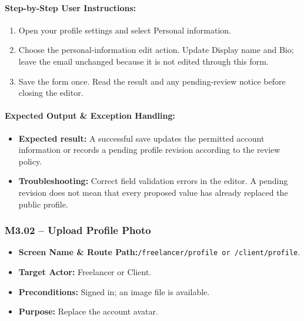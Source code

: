 \paragraph{Step-by-Step User Instructions:}
\begin{enumerate}[leftmargin=1.8em,itemsep=3pt]
  \item {} Open your profile settings and select Personal information.
  \item {} Choose the personal-information edit action. Update Display name and Bio; leave the email unchanged because it is not edited through this form.
  \item {} Save the form once. Read the result and any pending-review notice before closing the editor.
\end{enumerate}
\paragraph{Expected Output \& Exception Handling:}
\begin{itemize}[leftmargin=1.5em,itemsep=2pt]
  \item \textbf{Expected result:} A successful save updates the permitted account information or records a pending profile revision according to the review policy.
  \item \textbf{Troubleshooting:} Correct field validation errors in the editor. A pending revision does not mean that every proposed value has already replaced the public profile.
\end{itemize}

\newpage
\subsubsection{M3.02 -- Upload Profile Photo}
\begin{itemize}[leftmargin=1.5em,itemsep=2pt]
  \item \textbf{Screen Name \& Route Path:}\newline \texttt{/freelancer/profile or /client/profile}.
  \item \textbf{Target Actor:} Freelancer or Client.
  \item \textbf{Preconditions:} Signed in; an image file is available.
  \item \textbf{Purpose:} Replace the account avatar.
\end{itemize}
